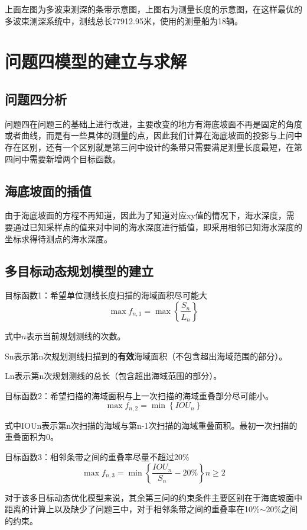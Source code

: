 \documentclass[12pt,a4paper]{article}
\begin{document}
	上面左图为多波束测深的条带示意图，上图右为测量长度的示意图，在这样最优的多波束测深系统中，测线总长77912.95米，使用的测量船为18辆。
	
	\section{问题四模型的建立与求解}
	\subsection{问题四分析}
	问题四在问题三的基础上进行改进，主要改变的地方有海底坡面不再是固定的角度或者曲线，而是有一些具体的测量的点，因此我们计算在海底坡面的投影与上问中存在区别，还有一个区别就是第三问中设计的条带只需要满足测量长度最短，在第四问中需要新增两个目标函数。
	\subsection{海底坡面的插值}
	由于海底坡面的方程不再知道，因此为了知道对应xy值的情况下，海水深度，需要通过已知采样点的值来对中间的海水深度进行插值，即采用相邻已知海水深度的坐标求得待测点的海水深度。
	\subsection{多目标动态规划模型的建立}
	目标函数1：希望单位测线长度扫描的海域面积尽可能大
	$$
	\max f_{n, 1}=\max \left\{\frac{S_n}{L_n}\right\}
	$$
	
	式中$n$表示当前规划测线的次数。
	
	Sn表示第n次规划测线扫描到的\textbf{有效}海域面积（不包含超出海域范围的部分）。
	
	Ln表示第n次规划测线的总长（包含超出海域范围的部分）。
	
	目标函数2：希望扫描的海域面积与上一次扫描的海域重叠部分尽可能小。
	$$
	\max f_{n, 2}=\min \left\{I O U_n\right\}
	$$
	
	式中IOUn表示第n次扫描的海域与第n-1次扫描的海域重叠面积。最初一次扫描的重叠面积为0。
	
	目标函数3：相邻条带之间的重叠率尽量不超过20\%
	$$
	\max f_{n, 3}=\min \left\{\frac{I O U_n}{S_n}-20 \%\right\} n \geq 2
	$$
	
	对于该多目标动态优化模型来说，其余第三问的约束条件主要区别在于海底坡面中距离的计算上以及缺少了问题三中，对于相邻条带之间的重叠率在10\%$\sim$20\%之间的约束。
\end{document}
